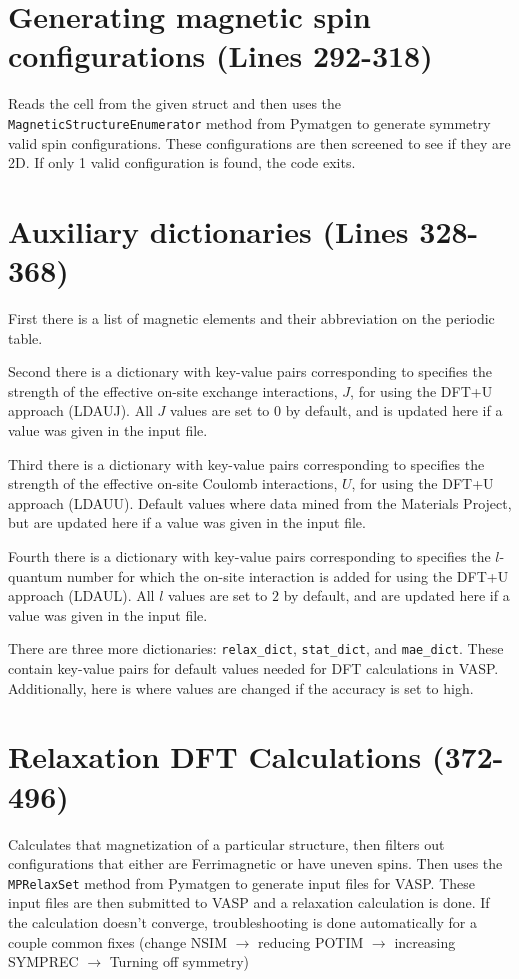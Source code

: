 \documentclass[12pt]{article}
\newcommand{\pmint}[1]{\texttt{#1}}
\begin{document}
\section*{Generating magnetic spin configurations (Lines 292-318)} %
Reads the cell from the given struct and then uses the \texttt{MagneticStructureEnumerator} method from Pymatgen to generate symmetry valid spin configurations. These configurations are then screened to see if they are 2D. If only 1 valid configuration is found, the code exits. 

\section*{Auxiliary dictionaries (Lines 328-368)} %

First there is a list of magnetic elements and their abbreviation on the periodic table. 

Second there is a dictionary with key-value pairs corresponding to specifies the strength of the effective on-site exchange interactions, $J$,  for using the DFT+U approach (LDAUJ). All $J$ values are set to $0$ by default, and is updated here if a value was given in the input file. 

Third there is a dictionary with key-value pairs corresponding to specifies the strength of the effective on-site Coulomb interactions, $U$,  for using the DFT+U approach (LDAUU). Default values where data mined from the Materials Project, but are updated here if a value was given in the input file.

Fourth there is a dictionary with key-value pairs corresponding to specifies the $l$-quantum number for which the on-site interaction is added  for using the DFT+U approach (LDAUL). All $l$ values are set to $2$ by default, and are updated here if a value was given in the input file.

There are three more dictionaries: \pmint{relax_dict}, \pmint{stat_dict}, and \pmint{mae_dict}. These contain key-value pairs for default values needed for DFT calculations in VASP. Additionally, here is where values are changed if the accuracy is set to high. 

\section*{Relaxation DFT Calculations (372-496) } %

Calculates that magnetization of a particular structure, then filters out configurations that either are Ferrimagnetic or have uneven spins. Then uses the \pmint{MPRelaxSet} method from Pymatgen to generate input files for VASP. These input files are then submitted to VASP and a relaxation calculation is done. If the calculation doesn't converge, troubleshooting is done automatically for a couple common fixes (change NSIM $\rightarrow$ reducing POTIM $\rightarrow$ increasing  SYMPREC $\rightarrow$ Turning off symmetry)
\end{document}

